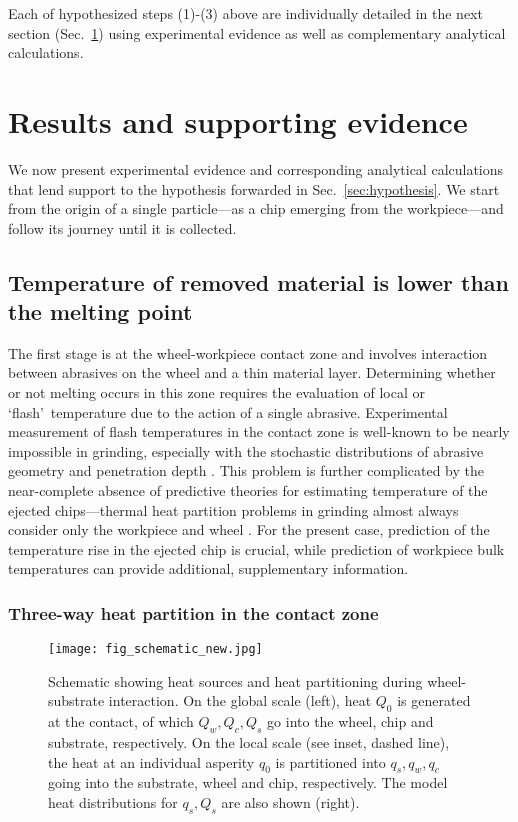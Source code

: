 \documentclass[11pt]{article}
\begin{document}
Each of hypothesized steps (1)-(3) above are individually detailed in the next section (Sec.~\ref{sec:results}) using experimental evidence as well as complementary analytical calculations.

\section{Results and supporting evidence}
\label{sec:results}

We now present experimental evidence and corresponding analytical calculations that lend support to the hypothesis forwarded in Sec.~\ref{sec:hypothesis}. We start from the origin of a single particle---as a chip emerging from the workpiece---and follow its journey until it is collected.

\subsection{Temperature of removed material is lower than the melting point}
\label{subsec:thermalCalc}
The first stage is at the wheel-workpiece contact zone and involves interaction between abrasives on the wheel and a thin material layer. Determining whether or not melting occurs in this zone requires the evaluation of local or \lq flash\rq\ temperature due to the action of a single abrasive. Experimental measurement of flash temperatures in the contact zone is well-known to be nearly impossible in grinding, especially with the stochastic distributions of abrasive geometry and penetration depth \cite{malkin2007thermal}. This problem is further complicated by the near-complete absence of predictive theories for estimating temperature of the ejected chips---thermal heat partition problems in grinding almost always consider only the workpiece and wheel \cite{malkin2007thermal, guo1994analytical}. For the present case, prediction of the temperature rise in the ejected chip is crucial, while prediction of workpiece bulk temperatures can provide additional, supplementary information.

\subsubsection{Three-way heat partition in the contact zone}

\begin{figure}
   \centering
  \texttt{[image: fig\_schematic\_new.jpg]}
  \caption{Schematic showing heat sources and heat partitioning during wheel-substrate interaction. On the global scale (left), heat $Q_0$ is generated at the contact, of which $Q_w, Q_c, Q_s$ go into the wheel, chip and substrate, respectively. On the local scale (see inset, dashed line), the heat at an individual asperity $q_0$ is partitioned into $q_s, q_w, q_c$ going into the substrate, wheel and chip, respectively. The model heat distributions for $q_s, Q_s$ are also shown (right).}
  \label{fig:grindingSchematic}
\end{figure}
\end{document}

